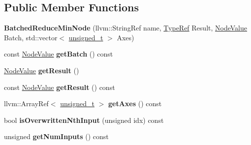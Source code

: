 \subsection*{Public Member Functions}
\begin{DoxyCompactItemize}
\item 
\mbox{\label{classglow_1_1_batched_reduce_min_node_a4583e6f89cf12da2bcc3df4fcf2fa4a6}} 
{\bfseries Batched\+Reduce\+Min\+Node} (llvm\+::\+String\+Ref name, \hyperlink{structglow_1_1_type}{Type\+Ref} Result, \hyperlink{structglow_1_1_node_value}{Node\+Value} Batch, std\+::vector$<$ \hyperlink{namespaceglow_a0ca574644e1e42ef193a9947fb4d8911}{unsigned\+\_\+t} $>$ Axes)
\item 
\mbox{\label{classglow_1_1_batched_reduce_min_node_a109aaf9aed1949f53144c9748507f2ea}} 
const \hyperlink{structglow_1_1_node_value}{Node\+Value} {\bfseries get\+Batch} () const
\item 
\mbox{\label{classglow_1_1_batched_reduce_min_node_a8f9476a5e59515b65cbb25f15ffb93b2}} 
\hyperlink{structglow_1_1_node_value}{Node\+Value} {\bfseries get\+Result} ()
\item 
\mbox{\label{classglow_1_1_batched_reduce_min_node_a307c4c5c503ea77c3a768925089e1eba}} 
const \hyperlink{structglow_1_1_node_value}{Node\+Value} {\bfseries get\+Result} () const
\item 
\mbox{\label{classglow_1_1_batched_reduce_min_node_ae89509014cd971aa8d899820c99536d6}} 
llvm\+::\+Array\+Ref$<$ \hyperlink{namespaceglow_a0ca574644e1e42ef193a9947fb4d8911}{unsigned\+\_\+t} $>$ {\bfseries get\+Axes} () const
\item 
\mbox{\label{classglow_1_1_batched_reduce_min_node_a4917ffd02ebc451616a1d43d4c26c0ed}} 
bool {\bfseries is\+Overwritten\+Nth\+Input} (unsigned idx) const
\item 
\mbox{\label{classglow_1_1_batched_reduce_min_node_a4d6aa58352aa74f42b28d02d8b06e8e5}} 
unsigned {\bfseries get\+Num\+Inputs} () const
\item 

\end{DoxyCompactItemize}
